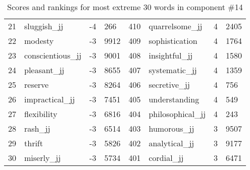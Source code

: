 \begin{table}[tbp]
\begin{tabular}{| rlr@{.}l | rlr@{.}l |}
    21 & sluggish\_jj & -4 & 266    &    410 & quarrelsome\_jj & 4 & 2405 \\
    22 & modesty & -3 & 9912    &    409 & sophistication & 4 & 1764 \\
    23 & conscientious\_jj & -3 & 9001    &    408 & insightful\_jj & 4 & 1580 \\
    24 & pleasant\_jj & -3 & 8655    &    407 & systematic\_jj & 4 & 1359 \\
    25 & reserve & -3 & 8264    &    406 & secretive\_jj & 4 & 756 \\
    26 & impractical\_jj & -3 & 7451    &    405 & understanding & 4 & 549 \\
    27 & flexibility & -3 & 6816    &    404 & philosophical\_jj & 4 & 243 \\
    28 & rash\_jj & -3 & 6514    &    403 & humorous\_jj & 3 & 9507 \\
    29 & thrift & -3 & 5826    &    402 & analytical\_jj & 3 & 9177 \\
    30 & miserly\_jj & -3 & 5734    &    401 & cordial\_jj & 3 & 6471 \\
    \hline
    \end{tabular}
    \caption{Scores and rankings for most extreme 30 words in component \#14} 
\end{table}
\clearpage
